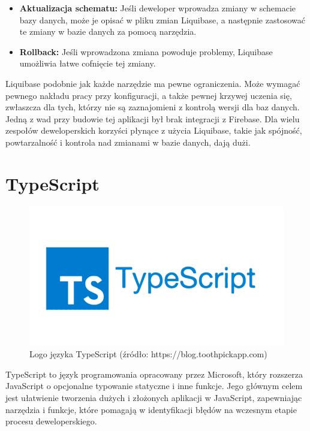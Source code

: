 \begin{itemize}
\item \textbf{Aktualizacja schematu:} Jeśli deweloper wprowadza zmiany w schemacie bazy danych, może je opisać w pliku zmian Liquibase, a następnie zastosować te zmiany w bazie danych za pomocą narzędzia.

\item \textbf{Rollback:} Jeśli wprowadzona zmiana powoduje problemy, Liquibase umożliwia łatwe cofnięcie tej zmiany.
\end{itemize}
Liquibase podobnie jak każde narzędzie ma pewne ograniczenia. Może wymagać pewnego nakładu pracy przy konfiguracji, a także pewnej krzywej uczenia się, zwłaszcza dla tych, którzy nie są zaznajomieni z kontrolą wersji dla baz danych. Jedną z wad przy budowie tej aplikacji był brak integracji z Firebase. Dla wielu zespołów deweloperskich korzyści płynące z użycia Liquibase, takie jak spójność, powtarzalność i kontrola nad zmianami w bazie danych, dają dużi\cite{liquibaseSpecs}.

\section{TypeScript}
\begin{figure}[h]
    \centering
    \includegraphics[width=0.5\linewidth]{./img/typescript.png}
    \caption{Logo języka TypeScript (źródło: https://blog.toothpickapp.com)}
    \label{fig:TypeScript}
\end{figure}
TypeScript to język programowania opracowany przez Microsoft, który rozszerza JavaScript o opcjonalne typowanie statyczne i inne funkcje. Jego głównym celem jest ułatwienie tworzenia dużych i złożonych aplikacji w JavaScript, zapewniając narzędzia i funkcje, które pomagają w identyfikacji błędów na wczesnym etapie procesu deweloperskiego.


